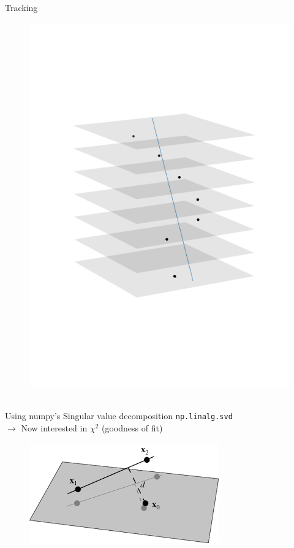 \documentclass{beamer}
\begin{document}
\begin{frame}[fragile]{Tracking}
\begin{minipage}{.32\textwidth}
\begin{figure}[H]
	    \includegraphics[trim=0 80 0 80,clip,width=\textwidth]{example_290252.png}
	\end{figure}
    \end{minipage}\\
    Using numpy's Singular value decomposition \verb]np.linalg.svd] \\[.1cm]
    \pause
    \( \rightarrow \) Now interested in \( \chi ^2 \) (goodness of fit) \\
    \begin{minipage}{.4\textwidth}
	\begin{figure}[H]
	    \centering
	    \includegraphics[width=\textwidth]{pointin3d}

\end{figure}
\end{minipage}
\end{frame}
\end{document}
